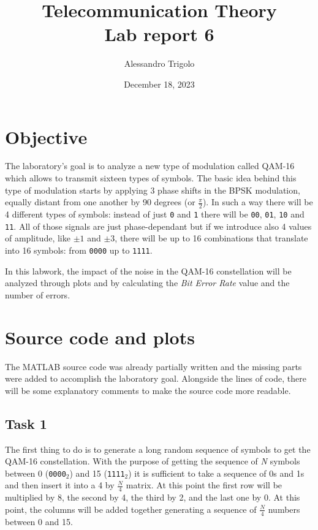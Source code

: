 \title{\vspace{160px} \textbf{\huge{Telecommunication Theory}} \\\vspace{17.5px} \LARGE{Lab report 6}  \vspace{10px}}
\author{Alessandro Trigolo}
\date{December 18, 2023}




\maketitle\newpage

 
\section*{Objective}
The laboratory's goal is to analyze a new type of modulation called QAM-16 which allows to transmit sixteen types of symbols. The basic idea behind this type of modulation starts by applying 3 phase shifts in the BPSK modulation, equally distant from one another by 90 degrees (or $\frac{\pi}{2}$). In such a way there will be 4 different types of symbols: instead of just \texttt{0} and \texttt{1} there will be \texttt{00}, \texttt{01}, \texttt{10} and \texttt{11}. All of those signals are just phase-dependant but if we introduce also 4 values of amplitude, like $\pm1$ and $\pm3$, there will be up to 16 combinations that translate into 16 symbols: from \texttt{0000} up to \texttt{1111}.

In this labwork, the impact of the noise in the QAM-16 constellation will be analyzed through plots and by calculating the \textsl{Bit Error Rate} value and the number of errors. 

\section*{Source code and plots}
\lstset{style = MatLab}
The MATLAB source code was already partially written and the missing parts were added to accomplish the laboratory goal. Alongside the lines of code, there will be some explanatory comments to make the source code more readable.

% 
\subsection*{Task 1}
The first thing to do is to generate a long random sequence of symbols to get the QAM-16 constellation. With the purpose of getting the sequence of \textit{N} symbols between 0 (\texttt{0000}$_2$) and 15 (\texttt{1111}$_2$) it is sufficient to take a sequence of 0s and 1s and then insert it into a 4 by $\frac{N}{4}$ matrix. At this point the first row will be multiplied by 8, the second by 4, the third by 2, and the last one by 0. At this point, the columns will be added together generating a sequence of $\frac{N}{4}$ numbers between 0 and 15.

